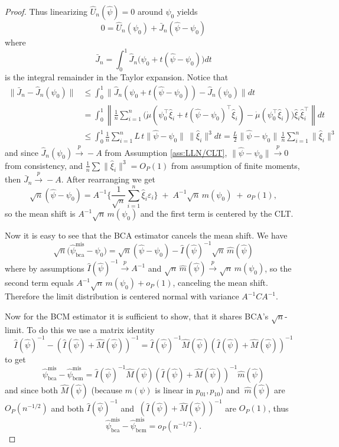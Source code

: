 \documentclass[11pt]{article}
\theoremstyle{definition}
\theoremstyle{remark}
\newcommand{\toP}{\xrightarrow{\,p\,}}
\begin{document}
\begin{proof}
Thus linearizing $\hat U_n(\hat\psi)=0$ around $\psi_0$ yields
\[ 0=\hat U_n(\psi_0) + \bar J_n(\hat\psi - \psi_0) \]
where
\[\bar J_n = \int_0^1\hat J_n\big(\psi_0 + t(\hat\psi - \psi_0)\big)dt \]
is the integral remainder in the Taylor expansion. Notice that
\[\begin{split}
\| \bar J_n-\hat J_n(\psi_0)\| &\leq \int_0^1 \| \hat J_n(\psi_0 +t(\hat\psi - \psi_0)) - \hat J_n(\psi_0) \|dt \\
&= \int_0^1 \left\| \frac{1}{n}\sum_{i=1}^n \big(\dot\mu(\psi_0^\top\hat\xi_i +t(\hat\psi - \psi_0)^\top\hat\xi_i) - \dot\mu(\psi_0^\top \hat\xi_i) \big)\hat\xi_i\hat\xi_i^\top \right\|dt \\
&\leq \int_0^1 \frac{1}{n}\sum_{i=1}^n L\, t\|\hat\psi-\psi_0 \|\, \|\hat\xi_i \|^3dt = \frac{L}{2}\|\hat\psi-\psi_0\| \, \frac{1}{n}\sum_{i=1}^n\|\hat\xi_i\|^3
\end{split}\]
and since $\hat J_n(\psi_0)\toP -A$ from Assumption \ref{ass:LLN/CLT}, $\|\hat\psi -\psi_0\|\toP 0$ from consistency, and $\frac{1}{n}\sum \|\hat\xi_i\|^3=O_P(1)$ from assumption of finite moments, then $\bar J_n \toP -A.$ After rearranging we get
\[
\sqrt{n}(\hat\psi-\psi_0)=A^{-1}\Big\{\frac{1}{\sqrt{n}}\sum_{i=1}^n \hat\xi_i\varepsilon_i\Big\}
\;+\;A^{-1}\sqrt{n}\,m(\psi_0)\;+\;o_P(1),
\]
so the mean shift is $A^{-1}\sqrt{n}\,m(\psi_0)$ and the first term is centered by the CLT.

Now it is easy to see that the BCA estimator cancels the mean shift. We have
\[
\sqrt{n}\big(\hat\psi^{\mathrm{mis}}_{\mathrm{bca}}-\psi_0\big)
=\sqrt{n}(\hat\psi-\psi_0)-\hat I(\hat\psi)^{-1}\sqrt{n}\,\hat m(\hat\psi)
\]
where by assumptions $\hat I(\hat\psi)^{-1}\toP A^{-1}$ and $\sqrt{n}\,\hat m(\hat\psi)\toP \sqrt{n}\,m(\psi_0)$, so the second term equals
$A^{-1}\sqrt{n}\,m(\psi_0)+o_P(1)$, canceling the mean shift.
Therefore the limit distribution is centered normal with variance $A^{-1}CA^{-1}$.

Now for the BCM estimator it is sufficient to show, that it shares BCA's $\sqrt n$-limit. To do this we use a matrix identity
\[ \hat I(\hat\psi)^{-1} - (\hat I(\hat\psi)+\hat M(\hat\psi))^{-1} = \hat I (\hat\psi)^{-1}\hat M(\hat\psi) (\hat I(\hat\psi) + \hat M(\hat\psi))^{-1} \]
to get
\[ \hat\psi^{\mathrm{mis}}_{\mathrm{bca}} - \hat\psi^{\mathrm{mis}}_{\mathrm{bcm}} = \hat I (\hat\psi)^{-1}\hat M(\hat\psi) (\hat I(\hat\psi) + \hat M(\hat\psi))^{-1} \hat m (\hat\psi) \]
and since both $\hat M(\hat\psi)$ (because $m({\psi})$ is linear in $p_{01}, p_{10}$) and $\ \hat m (\hat\psi)$ are $O_P(n^{-1/2})$ and both $\hat I (\hat\psi)^{-1}$ and $\ (\hat I(\hat\psi) + \hat M(\hat\psi))^{-1}$ are $O_P(1)$, thus
\[ \hat\psi^{\mathrm{mis}}_{\mathrm{bca}} - \hat\psi^{\mathrm{mis}}_{\mathrm{bcm}} = o_P(n^{-1/2}). \]
\end{proof}
\end{document}
